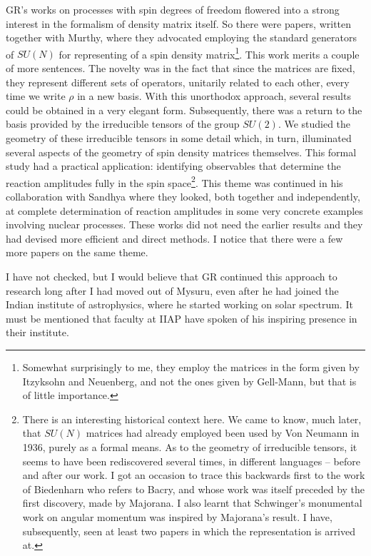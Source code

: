 GR's works on processes with spin degrees of freedom flowered into a 
strong interest in the formalism of density matrix itself.  So there 
were papers, written together with Murthy, where they advocated 
employing the standard generators of $SU(N)$ for representing of a spin 
density matrix\footnote{Somewhat surprisingly to me, they employ the 
matrices in the form given by Itzyksohn and Neuenberg, and not the ones 
given by Gell-Mann, but that is of little importance.}.  This work 
merits a couple of more sentences. The novelty was in the fact that 
since the matrices are fixed, they represent different sets of 
operators, unitarily related to each other, every time we write $\rho$ 
in a new basis.  With this unorthodox approach, several results could be 
obtained in a very elegant form. Subsequently, there was a return to the 
basis provided by the irreducible tensors of the group $SU(2)$. We 
studied the geometry of these irreducible tensors in some detail which, 
in turn, illuminated several aspects of the geometry of spin density 
matrices themselves. This formal study had a practical application: 
identifying observables that determine the reaction amplitudes fully in 
the spin space\footnote{There is an interesting historical context here. 
We came to know, much later, that $SU(N)$ matrices had already employed 
been used by Von Neumann in 1936, purely as a formal means. As to the 
geometry of irreducible tensors, it seems to have been rediscovered 
several times, in different languages -- before and after our work. I 
got an occasion to trace this backwards first to the work of Biedenharn 
who refers to Bacry, and whose work was itself preceded by the first 
discovery, made by Majorana. I also learnt that Schwinger's monumental 
work on angular momentum was inspired by Majorana's result. I have, 
subsequently, seen at least two papers in which the representation is 
arrived at.}. This theme was continued in his collaboration with Sandhya 
where they looked, both together and independently, at complete 
determination of reaction amplitudes in some very concrete examples 
involving nuclear processes. These works did not need the earlier 
results and they had devised more efficient and direct methods.  I 
notice that there were a few more papers on the same theme.


I have not checked, but I would believe that GR continued this approach 
to research long after I had moved out of Mysuru, even after he had 
joined the Indian institute of astrophysics, where he started working on 
solar spectrum. It must be mentioned that faculty at IIAP have spoken of 
his inspiring presence in their institute.

